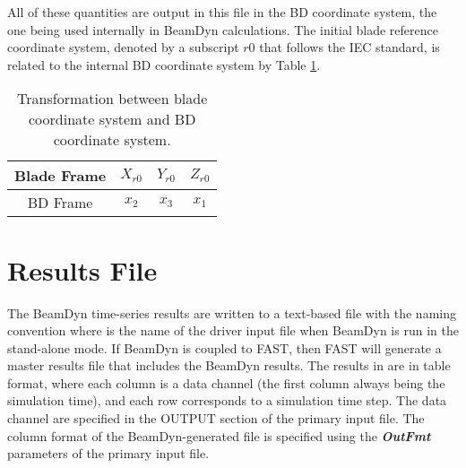All of these quantities are output in this file in the BD coordinate system, the one being used internally in BeamDyn calculations. 
The initial blade reference coordinate system, denoted by a subscript $r0$ that follows the IEC standard, is related to the internal BD coordinate system by Table \ref{tab:IECBD}. 
\begin{table}
\centering
\caption{Transformation between blade coordinate system and BD coordinate system.}
 \label{tab:IECBD}
 \begin{tabular}{| c | c | c | c |}
     \hline
    Blade Frame & $X_{r0}$ & $Y_{r0}$ & $Z_{r0}$ \\ \hline
    BD Frame     & $x_2$ & $x_3$ & $x_1$ \\
    \hline
\end{tabular}
\end{table}

\section{Results File}

The BeamDyn time-series results are written to a text-based file with the naming convention 
 where  is the name of the driver input file when BeamDyn is run in the stand-alone mode. 
If BeamDyn is coupled to FAST, then FAST will generate a master results file that includes the BeamDyn results. 
The results in  are in table format, where each column is a data channel (the first column always being the simulation time), and each row corresponds to a simulation time step. 
The data channel are specified in the OUTPUT section of the primary input file. 
The column format of the BeamDyn-generated file is specified using the  \textbf{\textit{OutFmt}} parameters of the primary input file. 

